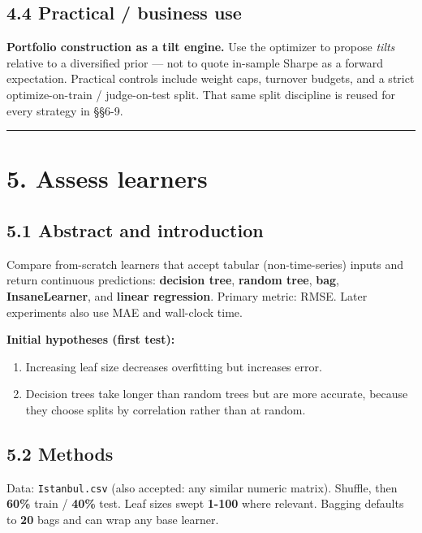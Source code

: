 \documentclass[
  11pt,
]{article}
\providecommand{\tightlist}{%
  \setlength{\itemsep}{0pt}\setlength{\parskip}{0pt}}
\begin{document}
\subsection{4.4 Practical / business
use}\label{practical-business-use-2}

\textbf{Portfolio construction as a tilt engine.} Use the optimizer to
propose \emph{tilts} relative to a diversified prior --- not to quote
in-sample Sharpe as a forward expectation. Practical controls include
weight caps, turnover budgets, and a strict optimize-on-train /
judge-on-test split. That same split discipline is reused for every
strategy in §§6-9.

\begin{center}\rule{0.5\linewidth}{0.5pt}\end{center}

\section{5. Assess learners}\label{assess-learners}

\subsection{5.1 Abstract and
introduction}\label{abstract-and-introduction}

Compare from-scratch learners that accept tabular (non-time-series)
inputs and return continuous predictions: \textbf{decision tree},
\textbf{random tree}, \textbf{bag}, \textbf{InsaneLearner}, and
\textbf{linear regression}. Primary metric: RMSE. Later experiments also
use MAE and wall-clock time.

\textbf{Initial hypotheses (first test):}

\begin{enumerate}
\def\labelenumi{\arabic{enumi}.}
\tightlist
\item
  Increasing leaf size decreases overfitting but increases error.\\
\item
  Decision trees take longer than random trees but are more accurate,
  because they choose splits by correlation rather than at random.
\end{enumerate}

\subsection{5.2 Methods}\label{methods}

Data: \texttt{Istanbul.csv} (also accepted: any similar numeric matrix).
Shuffle, then \textbf{60\%} train / \textbf{40\%} test. Leaf sizes swept
\textbf{1-100} where relevant. Bagging defaults to \textbf{20} bags and
can wrap any base learner.
\end{document}
